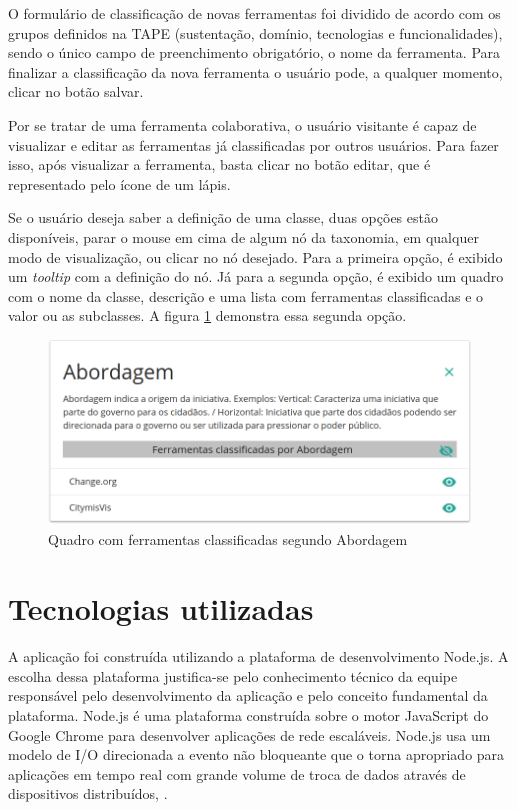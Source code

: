 \par
O formulário de classificação de novas ferramentas foi dividido de acordo com os grupos definidos na TAPE (sustentação, domínio, tecnologias e funcionalidades), sendo o único campo de preenchimento obrigatório, o nome da ferramenta. Para finalizar a classificação da nova ferramenta o usuário pode, a qualquer momento, clicar no botão salvar. 
\par
Por se tratar de uma ferramenta colaborativa, o usuário visitante é capaz de visualizar e editar as ferramentas já classificadas por outros usuários. 
Para fazer isso, após visualizar a ferramenta, basta clicar no botão editar, que é representado pelo ícone de um lápis. 

\par
Se o usuário deseja saber a definição de uma classe, duas opções estão disponíveis, parar o mouse em cima de algum nó da taxonomia, em qualquer modo de visualização, 
ou clicar no nó desejado. Para a primeira opção, é exibido um \textit{tooltip} com a definição do nó. Já para a segunda opção, é exibido um quadro com o nome da classe, descrição e 
uma lista com ferramentas classificadas e o valor ou as subclasses. A figura \ref{fig:tabela-ferramentas} demonstra essa segunda opção. 

\begin{figure}[!ht]
    \centering
    \includegraphics[scale=0.20]{./figuras/abordagem.png}
    \caption{Quadro com ferramentas classificadas segundo Abordagem}
    \label{fig:tabela-ferramentas}
\end{figure}
\par


\section {Tecnologias utilizadas}
\label{sec:tecnologias-utilizadas}

A aplicação foi construída utilizando a plataforma de desenvolvimento Node.js. A escolha dessa plataforma justifica-se pelo conhecimento técnico da equipe
responsável pelo desenvolvimento da aplicação e pelo conceito fundamental da plataforma. Node.js é uma plataforma construída sobre o motor JavaScript do 
Google Chrome para desenvolver aplicações de rede escaláveis. Node.js usa um modelo de I/O direcionada a evento não bloqueante que o torna
apropriado para aplicações em tempo real com grande volume de troca de dados através de dispositivos distribuídos, 
\cite{nodejs}.

